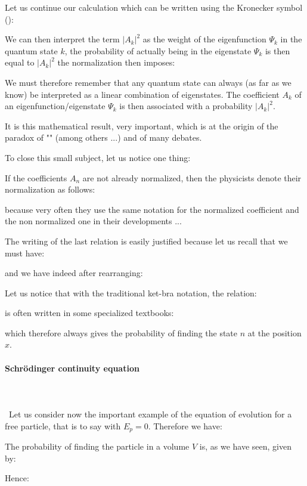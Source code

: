	Let us continue our calculation which can be written using the Kronecker symbol ():
	
	We can then interpret the term $|A_k|^2$ as the weight of the eigenfunction $\Psi_k$ in the quantum state $k$, the probability of actually being in the eigenstate $\Psi_k$ is then equal to $|A_k|^2$ the normalization then imposes:
	
	We must therefore remember that any quantum state can always (as far as we know) be interpreted as a linear combination of eigenstates. The coefficient $A_k$ of an eigenfunction/eigenstate $\Psi_k$ is then associated with a probability $|A_k|^2$.
	
	It is this mathematical result, very important, which is at the origin of the paradox of "" (among others ...) and of many debates.

	To close this small subject, let us notice one thing:

	If the coefficients $A_n$ are not already normalized, then the physicists denote their normalization as follows:
	
	because very often they use the same notation for the normalized coefficient and the non normalized one in their developments ...

The writing of the last relation is easily justified because let us recall that we must have:
	
	and we have indeed after rearranging:
	
	Let us notice that with the traditional ket-bra notation, the relation:
	
	is often written in some specialized textbooks:
	
	which therefore always gives the probability of finding the state $n$ at the position $x$.
	
	\pagebreak
	\paragraph{Schrödinger continuity equation}\mbox{}\\\\\
	Let us consider now the important example of the equation of evolution for a free particle, that is to say with $E_p=0$. Therefore we have:
	
	The probability of finding the particle in a volume $V$ is, as we have seen, given by:
	
	Hence:
	
